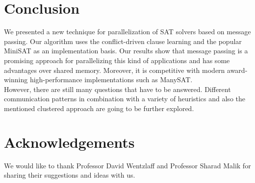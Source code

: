 \documentclass[letterpaper, compsoc, conference]{IEEEtran}
\begin{document}
\section{Conclusion}
\label{sec:finish}

We presented a new technique for parallelization of SAT solvers based
on message passing. Our algorithm uses the conflict-driven clause learning 
and the popular MiniSAT as an implementation basis. Our results show that 
message passing is a promising approach for parallelizing this kind of 
applications and has some advantages over shared memory. Moreover, it is
competitive with modern award-winning high-performance implementations such as ManySAT. \\
\indent However, there are still many questions that have to be answered. Different 
communication patterns in combination with a variety of heuristics and also the mentioned clustered approach are going to be further explored.

\section*{Acknowledgements}

We would like to thank Professor David Wentzlaff and Professor Sharad Malik for
sharing their suggestions and ideas with us.



\end{document}
